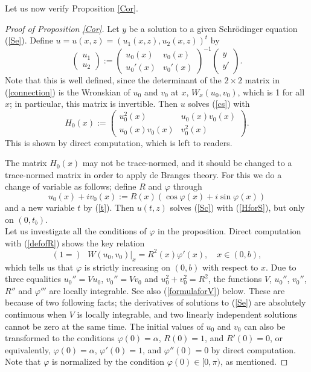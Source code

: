 \documentclass[preprint,12pt]{elsarticle}
\begin{document}
 Let us now verify Proposition \ref{Cor}. 
\begin{proof}[Proof of Proposition \ref{Cor}]
Let $y$ be a solution to a given Schr\"odinger equation (\ref{Se}). Define $u=u(x,z)=(u_1(x,z), u_2(x,z))^t$ by 
\begin{equation}
\label{connection}
 \begin{pmatrix} u_1 \\ u_2 \end{pmatrix}:=
\begin{pmatrix} u_0(x) & v_0(x) \\ u_0'(x) & v_0'(x) \end{pmatrix}^{-1}\begin{pmatrix} y \\ y' \end{pmatrix}.
\end{equation}
Note that this is well defined, since the determinant of the $2\times 2$ matrix in (\ref{connection}) is the Wronskian of $u_0$ and $v_0$ at $x$, $W_x(u_0,v_0)$, which is 1 for all $x$; in particular, this matrix is invertible. Then $u$ solves (\ref{cs}) with 
\begin{equation*}
H_0(x):= \begin{pmatrix} u_0^2(x) & u_0(x)v_0(x) \\ u_0(x)v_0(x) & v_0^2(x) \end{pmatrix}. 
\end{equation*}
This is shown by direct computation, which is left to readers. 

The matrix $H_0(x)$ may not be trace-normed, and it should be changed to a trace-normed matrix in order to apply de Branges theory. 
For this we do a change of variable as follows; define $R$ and $\varphi$ through
\begin{equation}
\label{defofR}
 u_0(x)+iv_0(x):=R(x) (\cos\varphi(x)+i\sin\varphi(x))
\end{equation}
 and a new variable $t$ by (\ref{t}). Then $u(t,z)$ solves (\ref{Sc}) with (\ref{HforS}), but only on $(0,t_b)$.\\

Let us investigate all the conditions of $\varphi$ in the proposition. Direct computation with (\ref{defofR}) shows the key relation  
\begin{equation}
\label{Wron}
(1=) \textrm{ } W(u_0,v_0)|_{x}=R^2(x)\varphi'(x), \quad x\in(0,b), 
\end{equation} 
which tells us that $\varphi$ is strictly increasing on $(0,b)$ with respect to $x$. Due to three equalities $u_0''=Vu_0$, $v_0''=Vv_0$ and $u^2_0+v^2_0=R^2$, the functions $V$, $u_0''$, $v_0''$, $R''$ and $\varphi'''$ are locally integrable. See also (\ref{formulaforV}) below. These are because of two following facts; the derivatives of solutions to (\ref{Se}) are absolutely continuous when $V$ is locally integrable, and two linearly independent solutions cannot be zero at the same time. The initial values of $u_0$ and $v_0$ can also be transformed to the conditions $\varphi(0)=\alpha$, $R(0)=1$, and $R'(0)=0$, or equivalently, $\varphi(0)=\alpha$, $\varphi'(0)=1$, and $\varphi''(0)=0$ by direct computation. Note that $\varphi$ is normalized by the condition $\varphi(0)\in[0,\pi)$, as mentioned.


\end{proof}
\end{document}
